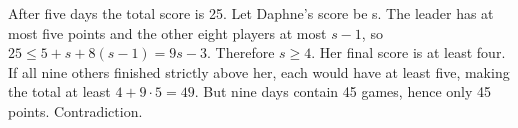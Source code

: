 After five days the total score is 25. Let Daphne's score be s. The leader has at most five points and the other eight players at most $s-1$, so $25\le5+s+8(s-1)=9s-3$. Therefore $s\ge4$. Her final score is at least four. If all nine others finished strictly above her, each would have at least five, making the total at least $4+9\cdot5=49$. But nine days contain 45 games, hence only 45 points. Contradiction.
